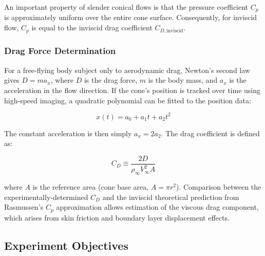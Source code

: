An important property of slender conical flows is that the pressure coefficient $C_p$ is approximately uniform over the entire cone surface. Consequently, for inviscid flow, $C_p$ is equal to the inviscid drag coefficient $C_{D,\text{inviscid}}$.

\subsubsection{Drag Force Determination}

For a free-flying body subject only to aerodynamic drag, Newton's second law gives $D = ma_x$, where $D$ is the drag force, $m$ is the body mass, and $a_x$ is the acceleration in the flow direction. If the cone's position is tracked over time using high-speed imaging, a quadratic polynomial can be fitted to the position data:

\begin{equation}
    x(t) = a_0 + a_1 t + a_2 t^2
    \label{eq:quadratic-fit}
\end{equation}

The constant acceleration is then simply $a_x = 2a_2$. The drag coefficient is defined as:

\begin{equation}
    C_D \equiv \frac{2D}{\rho_\infty V_\infty^2 A}
    \label{eq:drag-coefficient}
\end{equation}

\noindent where $A$ is the reference area (cone base area, $A = \pi r^2$). Comparison between the experimentally-determined $C_D$ and the inviscid theoretical prediction from Rasmussen's $C_p$ approximation allows estimation of the viscous drag component, which arises from skin friction and boundary layer displacement effects.

\subsection{Experiment Objectives} \label{sec:introduction/objectives}


